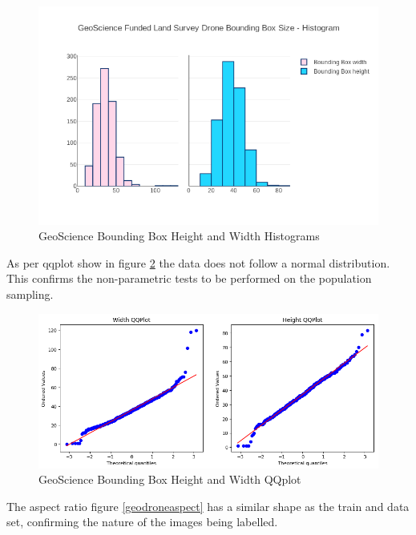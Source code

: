 \documentclass{IEEEtran}
\begin{document}
\begin{figure}[ht]
\centering
\label{geodronethist}
\includegraphics[scale=0.4]{images/geoscience-histogram.png}
\caption{GeoScience Bounding Box Height and Width Histograms}
\end{figure}

As per qqplot show in figure \ref{geodroneqqplot} the data does not follow a normal distribution. This confirms the non-parametric tests to be performed on the population sampling.

\begin{figure}[h]
\centering
\label{geodroneqqplot}
\includegraphics[scale=0.4]{images/geoscience-qqplot.png}
\caption{GeoScience Bounding Box Height and Width QQplot}
\end{figure}

The aspect ratio figure \ref{geodroneaspect} has a similar shape as the train and data set, confirming the nature of the images being labelled. 
\end{document}
